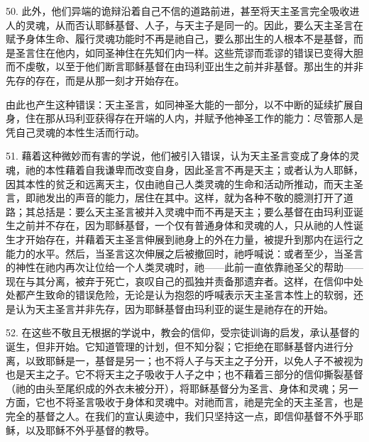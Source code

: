 50. 此外，他们异端的诡辩沿着自己不信的道路前进，甚至将天主圣言完全吸收进人的灵魂，从而否认耶稣基督、人子，与天主子是同一的。因此，要么天主圣言在赋予身体生命、履行灵魂功能时不再是祂自己，要么那出生的人根本不是基督，而是圣言住在他内，如同圣神住在先知们内一样。这些荒谬而乖谬的错误已变得大胆而不虔敬，以至于他们断言耶稣基督在由玛利亚出生之前并非基督。那出生的并非先存的存在，而是从那一刻才开始存在。\par

由此也产生这种错误：天主圣言，如同神圣大能的一部分，以不中断的延续扩展自身，住在那从玛利亚获得存在开端的人内，并赋予他神圣工作的能力：尽管那人是凭自己灵魂的本性生活而行动。\par

51. 藉着这种微妙而有害的学说，他们被引入错误，认为天主圣言变成了身体的灵魂，祂的本性藉着自我谦卑而改变自身，因此圣言不再是天主；或者认为人耶稣，因其本性的贫乏和远离天主，仅由祂自己人类灵魂的生命和活动所推动，而天主圣言，即祂发出的声音的能力，居住在其中。这样，就为各种不敬的臆测打开了道路；其总括是：要么天主圣言被并入灵魂中而不再是天主；要么基督在由玛利亚诞生之前并不存在，因为耶稣基督，一个仅有普通身体和灵魂的人，只从祂的人性诞生才开始存在，并藉着天主圣言伸展到祂身上的外在力量，被提升到那内在运行之能力的水平。然后，当圣言这次伸展之后被撤回时，祂呼喊说：或者至少，当圣言的神性在祂内再次让位给一个人类灵魂时，祂——此前一直依靠祂圣父的帮助——现在与其分离，被弃于死亡，哀叹自己的孤独并责备那遗弃者。这样，在信仰中处处都产生致命的错误危险，无论是认为抱怨的呼喊表示天主圣言本性上的软弱，还是认为天主圣言并非先存，因为耶稣基督由玛利亚的诞生是祂存在的开始。\par

52. 在这些不敬且无根据的学说中，教会的信仰，受宗徒训诲的启发，承认基督的诞生，但非开始。它知道管理的计划，但不知分裂；它拒绝在耶稣基督内进行分离，以致耶稣是一，基督是另一；也不将人子与天主之子分开，以免人子不被视为也是天主之子。它不将天主之子吸收于人子之中；也不藉着三部分的信仰撕裂基督（祂的由头至尾织成的外衣未被分开），将耶稣基督分为圣言、身体和灵魂；另一方面，它也不将圣言吸收于身体和灵魂中。对祂而言，祂是完全的天主圣言，也是完全的基督之人。在我们的宣认奥迹中，我们只坚持这一点，即信仰基督不外乎耶稣，以及耶稣不外乎基督的教导。\par

